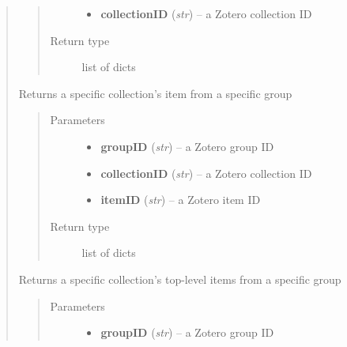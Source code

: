 \documentclass[letterpaper,10pt,english]{sphinxmanual}
\begin{document}
\begin{quote}
\begin{fulllineitems}
\begin{quote}
\begin{description}
\begin{itemize}
\item {} 
\textbf{collectionID} (\emph{str}) -- a Zotero collection ID

\end{itemize}

\item[{Return type}] \leavevmode
list of dicts

\end{description}\end{quote}

\end{fulllineitems}


\begin{fulllineitems}
\label{index:pyzotero.zotero.Zotero.group_collection_item}
Returns a specific collection's item from a specific group
\begin{quote}\begin{description}
\item[{Parameters}] \leavevmode\begin{itemize}
\item {} 
\textbf{groupID} (\emph{str}) -- a Zotero group ID

\item {} 
\textbf{collectionID} (\emph{str}) -- a Zotero collection ID

\item {} 
\textbf{itemID} (\emph{str}) -- a Zotero item ID

\end{itemize}

\item[{Return type}] \leavevmode
list of dicts

\end{description}\end{quote}

\end{fulllineitems}


\begin{fulllineitems}
\label{index:pyzotero.zotero.Zotero.group_collection_top}
Returns a specific collection's top-level items from a specific group
\begin{quote}\begin{description}
\item[{Parameters}] \leavevmode\begin{itemize}
\item {} 
\textbf{groupID} (\emph{str}) -- a Zotero group ID


\end{itemize}
\end{description}
\end{quote}
\end{fulllineitems}
\end{quote}
\end{document}
